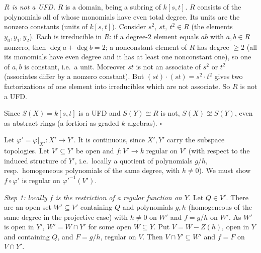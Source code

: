 \documentclass[11pt]{article}
\begin{document}
\emph{$R$ is not a UFD.} $R$ is a domain, being a subring of $k[s,t]$. $R$ consists of the polynomials all of whose monomials have even total degree. Its units are the nonzero constants (units of $k[s,t]$). Consider $s^2,\ st,\ t^2\in R$ (the elements $y_0,y_1,y_2$). Each is irreducible in $R$: if a degree-$2$ element equals $ab$ with $a,b\in R$ nonzero, then $\deg a+\deg b=2$; a nonconstant element of $R$ has degree $\ge2$ (all its monomials have even degree and it has at least one nonconstant one), so one of $a,b$ is constant, i.e.\ a unit. Moreover $st$ is not an associate of $s^2$ or $t^2$ (associates differ by a nonzero constant). But $(st)\cdot(st)=s^2\cdot t^2$ gives two factorizations of one element into irreducibles which are not associate. So $R$ is not a UFD.

Since $S(X)=k[s,t]$ is a UFD and $S(Y)\cong R$ is not, $S(X)\not\cong S(Y)$, even as abstract rings (a fortiori as graded $k$-algebras). \hfill$\square$


\pf
Let $\varphi'=\varphi|_{X'}:X'\to Y'$. It is continuous, since $X',Y'$ carry the subspace topologies. Let $V'\subseteq Y'$ be open and $f:V'\to k$ regular on $V'$ (with respect to the induced structure of $Y'$, i.e.\ locally a quotient of polynomials $g/h$, resp.\ homogeneous polynomials of the same degree, with $h\ne0$). We must show $f\circ\varphi'$ is regular on $\varphi'^{-1}(V')$.

\emph{Step 1: locally $f$ is the restriction of a regular function on $Y$.} Let $Q\in V'$. There are an open set $W'\subseteq V'$ containing $Q$ and polynomials $g,h$ (homogeneous of the same degree in the projective case) with $h\ne0$ on $W'$ and $f=g/h$ on $W'$. As $W'$ is open in $Y'$, $W'=W\cap Y'$ for some open $W\subseteq Y$. Put $V=W-Z(h)$, open in $Y$ and containing $Q$, and $F=g/h$, regular on $V$. Then $V\cap Y'\subseteq W'$ and $f=F$ on $V\cap Y'$.
\end{document}
